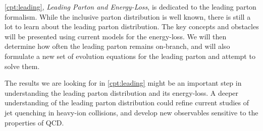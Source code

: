 \documentclass[main.tex]{subfiles}
\begin{document}
\autoref{cpt:leading}, \textit{Leading Parton and Energy-Loss}, is dedicated to the leading parton formalism. While the inclusive parton distribution is well known, there is still a lot to learn about the leading parton distribution. The key concepts and obstacles will be presented using current models for the energy-loss. We will then determine how often the leading parton remains on-branch, and will also formulate a new set of evolution equations for the leading parton and attempt to solve them.

The results we are looking for in \autoref{cpt:leading} might be an important step in understanding the leading parton distribution and its energy-loss. A deeper understanding of the leading parton distribution could refine current studies of jet quenching in heavy-ion collisions, and develop new observables sensitive to the properties of QCD.
\end{document}
